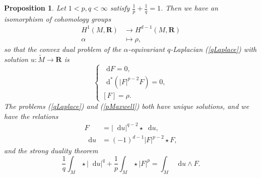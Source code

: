 \documentclass[reqno,11pt]{amsart}
\newcommand{\RR}{\mathbf{R}}
\newcommand*\dif{\mathop{}\!\mathrm{d}}
\newtheorem{proposition}[theorem]{Proposition}
\theoremstyle{definition}
\numberwithin{equation}{section}
\begin{document}
\begin{proposition}\label{convex duality}
Let $1 < p, q < \infty$ satisfy $\frac{1}{p} + \frac{1}{q} = 1$.
Then we have an isomorphism of cohomology groups
\begin{align*}
H^1(M, \RR) &\to H^{d - 1}(M, \RR) \\
\alpha &\mapsto \rho,
\end{align*}
so that the convex dual problem of the $\alpha$-equivariant $q$-Laplacian (\ref{qLaplace}) with solution $u: \tilde M \to \RR$ is
\begin{equation}\label{pMaxwell}
\begin{cases}
	\dif F = 0, \\
	\dif^*(|F|^{p - 2} F) = 0, \\
	[F] = \rho.
\end{cases}
\end{equation}
The problems (\ref{qLaplace}) and (\ref{pMaxwell}) both have unique solutions, and we have the relations
\begin{align}
F &= |\dif u|^{q - 2} \star \dif u, \label{extremality} \\
\dif u &= (-1)^{d - 1} |F|^{p - 2} \star F, \label{inverse extremality}
\end{align}
and the strong duality theorem 
\begin{equation}\label{strong duality}
\frac{1}{q} \int_M \star |\dif u|^q + \frac{1}{p} \int_M \star |F|^p = \int_M \dif u \wedge F.
\end{equation}
\end{proposition}
\end{document}
